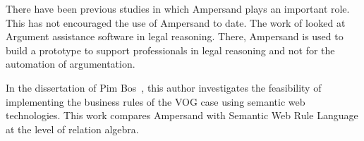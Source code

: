 There have been previous studies in which Ampersand plays an important role.
This has not encouraged the use of Ampersand to date.
The work of  looked at Argument assistance software in legal reasoning.
There, Ampersand is used to build a prototype to support professionals in legal reasoning and not for the automation of argumentation.

In the dissertation of Pim Bos~, this author investigates the feasibility of implementing the business rules of the VOG case using semantic web technologies.
This work compares Ampersand with Semantic Web Rule Language at the level of relation algebra.



